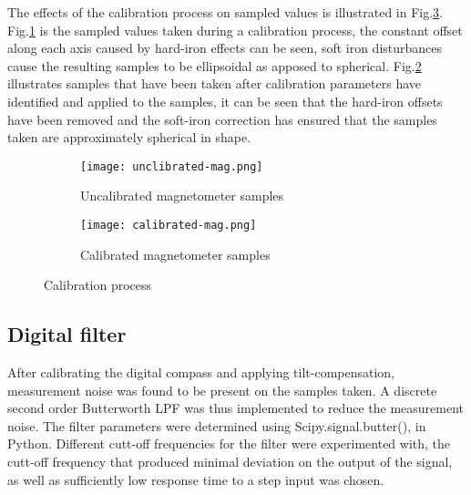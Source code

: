The effects of the calibration process on sampled values is illustrated in Fig.\ref{fig:calibration}. Fig.\ref{fig:uncalibrated} is the sampled values taken during a calibration process, the constant
offset along each axis caused by hard-iron effects can be seen, soft iron disturbances cause the resulting samples to be ellipsoidal as apposed to spherical. Fig.\ref{fig:calibrated} illustrates 
samples that have been taken after calibration parameters have identified and applied to the samples, it can be seen that the hard-iron offsets have been removed and the soft-iron correction has 
ensured that the samples taken are approximately spherical in shape. 

\begin{figure}
    \centering
    \begin{subfigure}[!h]{0.49\textwidth}
        \texttt{[image: unclibrated-mag.png]}
        \caption{Uncalibrated magnetometer samples}
        \label{fig:uncalibrated}
    \end{subfigure}
    \hfill
    \begin{subfigure}[!h]{0.49\textwidth}
        \texttt{[image: calibrated-mag.png]}
        \caption{Calibrated magnetometer samples}
        \label{fig:calibrated}
    \end{subfigure}
    \caption{Calibration process}
    \label{fig:calibration}
\end{figure}



\subsection{Digital filter}
After calibrating the digital compass and applying tilt-compensation, measurement noise was found to be present on the samples taken. A discrete second order Butterworth LPF was thus implemented to 
reduce the measurement noise. The filter parameters were determined using Scipy.signal.butter(), in Python. Different cutt-off frequencies for the filter were experimented with, the cutt-off frequency 
that produced minimal deviation on the output of the signal, as well as sufficiently low response time to a step input was chosen. 

